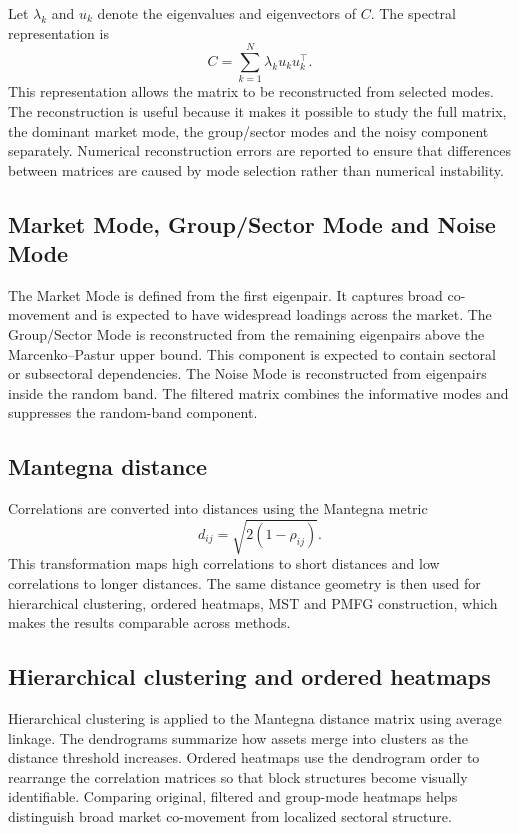 Let $\lambda_k$ and $u_k$ denote the eigenvalues and eigenvectors of $C$. The spectral representation is
\begin{equation}
C = \sum_{k=1}^{N} \lambda_k u_k u_k^\top.
\end{equation}
This representation allows the matrix to be reconstructed from selected modes. The reconstruction is useful because it makes it possible to study the full matrix, the dominant market mode, the group/sector modes and the noisy component separately. Numerical reconstruction errors are reported to ensure that differences between matrices are caused by mode selection rather than numerical instability.

\subsection{Market Mode, Group/Sector Mode and Noise Mode}

The Market Mode is defined from the first eigenpair. It captures broad co-movement and is expected to have widespread loadings across the market. The Group/Sector Mode is reconstructed from the remaining eigenpairs above the Marcenko--Pastur upper bound. This component is expected to contain sectoral or subsectoral dependencies. The Noise Mode is reconstructed from eigenpairs inside the random band. The filtered matrix combines the informative modes and suppresses the random-band component.

\subsection{Mantegna distance}

Correlations are converted into distances using the Mantegna metric
\begin{equation}
d_{ij} = \sqrt{2(1-\rho_{ij})}.
\end{equation}
This transformation maps high correlations to short distances and low correlations to longer distances. The same distance geometry is then used for hierarchical clustering, ordered heatmaps, MST and PMFG construction, which makes the results comparable across methods.

\subsection{Hierarchical clustering and ordered heatmaps}

Hierarchical clustering is applied to the Mantegna distance matrix using average linkage. The dendrograms summarize how assets merge into clusters as the distance threshold increases. Ordered heatmaps use the dendrogram order to rearrange the correlation matrices so that block structures become visually identifiable. Comparing original, filtered and group-mode heatmaps helps distinguish broad market co-movement from localized sectoral structure.

